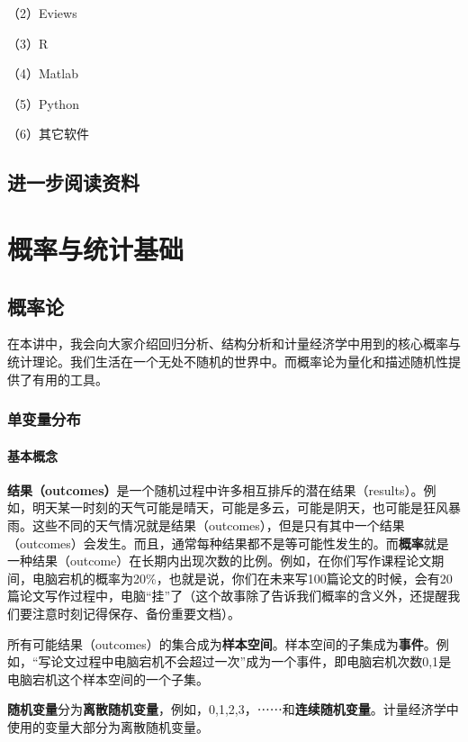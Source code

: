 \documentclass[cn,10pt,math=newtx,citestyle=gb7714-2015,bibstyle=gb7714-2015]{elegantbook}
\begin{document}
	（2）Eviews
	
	（3）R
	
	（4）Matlab
	
	（5）Python
	
	（6）其它软件
	\section{进一步阅读资料}
	
	
	
	\chapter{概率与统计基础}
	\section{概率论}
	在本讲中，我会向大家介绍回归分析、结构分析和计量经济学中用到的核心概率与统计理论。我们生活在一个无处不随机的世界中。而概率论为量化和描述随机性提供了有用的工具。
	\subsection{单变量分布}
	\subsubsection{基本概念}
	\textbf{结果（outcomes）}是一个随机过程中许多相互排斥的潜在结果（results）。例如，明天某一时刻的天气可能是晴天，可能是多云，可能是阴天，也可能是狂风暴雨。这些不同的天气情况就是结果（outcomes），但是只有其中一个结果（outcomes）会发生。而且，通常每种结果都不是等可能性发生的。而\textbf{概率}就是一种结果（outcome）在长期内出现次数的比例。例如，在你们写作课程论文期间，电脑宕机的概率为20\%，也就是说，你们在未来写100篇论文的时候，会有20篇论文写作过程中，电脑“挂”了（这个故事除了告诉我们概率的含义外，还提醒我们要注意时刻记得保存、备份重要文档）。
	
	所有可能结果（outcomes）的集合成为\textbf{样本空间}。样本空间的子集成为\textbf{事件}。例如，“写论文过程中电脑宕机不会超过一次”成为一个事件，即电脑宕机次数{0,1}是电脑宕机这个样本空间的一个子集。
	
	\textbf{随机变量}分为\textbf{离散随机变量}，例如，0,1,2,3，⋯⋯和\textbf{连续随机变量}。计量经济学中使用的变量大部分为离散随机变量。
	
\end{document}
